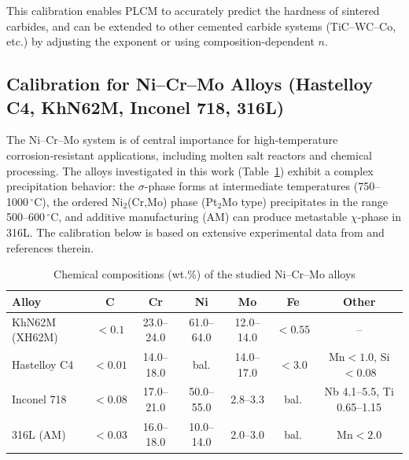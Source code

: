 \documentclass[12pt,a4paper]{article}
\begin{document}
	This calibration enables PLCM to accurately predict the hardness of sintered carbides, and can be extended to other cemented carbide systems (TiC–WC–Co, etc.) by adjusting the exponent or using composition‑dependent $n$.
	
	
	
	\subsection{Calibration for Ni–Cr–Mo Alloys (Hastelloy C4, KhN62M, Inconel 718, 316L)}
	\label{subsec:calibration_nicrmo}
	
	The Ni–Cr–Mo system is of central importance for high‑temperature corrosion‑resistant applications, including molten salt reactors and chemical processing. The alloys investigated in this work (Table~\ref{tab:nicrmo_compositions}) exhibit a complex precipitation behavior: the \(\sigma\)-phase forms at intermediate temperatures (750–1000\,\(^{\circ}\)C), the ordered Ni\(_2\)(Cr,Mo) phase (Pt\(_2\)Mo type) precipitates in the range 500–600\,\(^{\circ}\)C, and additive manufacturing (AM) can produce metastable \(\chi\)-phase in 316L. The calibration below is based on extensive experimental data from \cite{dis2025} and references therein.
	
	\begin{table}[htbp]
		\centering
		\caption{Chemical compositions (wt.\%) of the studied Ni–Cr–Mo alloys}
		\label{tab:nicrmo_compositions}
		\begin{tabular}{lcccccc}
			\toprule
			\textbf{Alloy} & \textbf{C} & \textbf{Cr} & \textbf{Ni} & \textbf{Mo} & \textbf{Fe} & \textbf{Other} \\
			\midrule
			KhN62M (XH62M) & \(<0.1\) & 23.0–24.0 & 61.0–64.0 & 12.0–14.0 & \(<0.55\) & – \\
			Hastelloy C4   & \(<0.01\) & 14.0–18.0 & bal. & 14.0–17.0 & \(<3.0\) & Mn\(<1.0\), Si\(<0.08\) \\
			Inconel 718    & \(<0.08\) & 17.0–21.0 & 50.0–55.0 & 2.8–3.3 & bal. & Nb 4.1–5.5, Ti 0.65–1.15 \\
			316L (AM)      & \(<0.03\) & 16.0–18.0 & 10.0–14.0 & 2.0–3.0 & bal. & Mn\(<2.0\) \\
			\bottomrule
		\end{tabular}
	\end{table}
	
\end{document}
